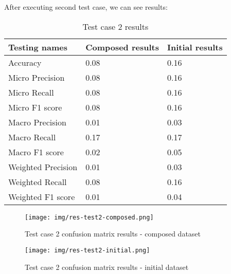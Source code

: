 After executing second test case, we can see results:
\begin{table}[!ht]
  \centering
    \begin{tabular}{ |m{14em}|m{9em}|m{9em}| } 
     \hline
        Testing names & Composed results & Initial results \\ 
     \hline
        Accuracy & 0.08 & 0.16 \\
     \hline
        Micro Precision & 0.08 & 0.16 \\
     \hline
        Micro Recall & 0.08 & 0.16 \\
     \hline
        Micro F1 score & 0.08 & 0.16 \\
     \hline
        Macro Precision & 0.01 & 0.03 \\
     \hline
        Macro Recall & 0.17 & 0.17 \\
     \hline
        Macro F1 score & 0.02 & 0.05 \\
     \hline
        Weighted Precision & 0.01 & 0.03 \\
     \hline
        Weighted Recall & 0.08 & 0.16 \\
     \hline
        Weighted F1 score & 0.01 & 0.04 \\
     \hline
    \end{tabular}
\caption{Test case 2 results}
\end{table}

\begin{figure}[H]
    \centerline{\texttt{[image: img/res-test2-composed.png]}}
    \caption{Test case 2 confusion matrix results - composed dataset}
\end{figure}
\begin{figure}[H]
    \centerline{\texttt{[image: img/res-test2-initial.png]}}
    \caption{Test case 2 confusion matrix results - initial dataset}
\end{figure}

